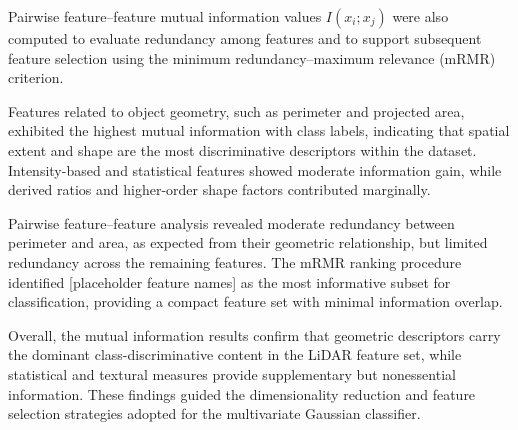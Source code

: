 Pairwise feature–feature mutual information values $I(x_i; x_j)$ were also computed to evaluate redundancy among features and to support subsequent feature selection using the minimum redundancy–maximum relevance (mRMR) criterion.

Features related to object geometry, such as perimeter and projected area, exhibited the highest mutual information with class labels, indicating that spatial extent and shape are the most discriminative descriptors within the dataset. 
Intensity-based and statistical features showed moderate information gain, while derived ratios and higher-order shape factors contributed marginally.

Pairwise feature–feature analysis revealed moderate redundancy between perimeter and area, as expected from their geometric relationship, but limited redundancy across the remaining features. 
The mRMR ranking procedure identified [placeholder feature names] as the most informative subset for classification, providing a compact feature set with minimal information overlap.

Overall, the mutual information results confirm that geometric descriptors carry the dominant class-discriminative content in the LiDAR feature set, while statistical and textural measures provide supplementary but nonessential information. 
These findings guided the dimensionality reduction and feature selection strategies adopted for the multivariate Gaussian classifier.

